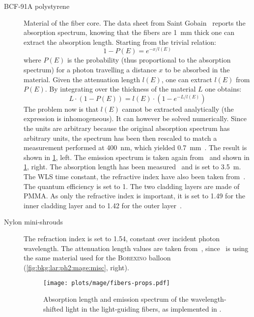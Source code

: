 \begin{description}

  \item[BCF-91A polystyrene] Material of the fiber core. The data sheet from Saint
    Gobain~\cite{FibersData} reports the absorption spectrum, knowing that the fibers are
    1~mm thick one can extract the absorption length. Starting from the trivial relation:
    \[
      1 - P(E) = e^{-x/l(E)}
    \]
    where $P(E)$ is the probability (thus proportional to the absorption
    spectrum) for a photon travelling a distance $x$ to be absorbed in the
    material. Given the attenuation length $l(E)$, one can extract $l(E)$ from
    $P(E)$. By integrating over the thickness of the material $L$ one obtains:
    \[
      L \cdot (1 - P(E)) = l(E) \cdot (1 - e^{-L/l(E)})
    \]
    The problem now is that $l(E)$ cannot be extracted analytically (the expression is
    inhomogeneous). It can however be solved numerically.  Since the units are arbitrary
    because the original absorption spectrum has arbitrary units, the spectrum has been
    then rescaled to match a measurement performed at 400~nm, which yielded
    0.7~mm~\cite{Kneissl2012}. The result is shown in
    \cref{fig:bkg:lar:ph2:mage:fibers-props}, left. The emission spectrum is taken again
    from~\cite{FibersData} and shown in \cref{fig:bkg:lar:ph2:mage:fibers-props}, right.
    The absorption length has been measured~\cite{Kneissl2012} and is set to 3.5~m. The
    WLS time constant, the refractive index have also been taken from~\cite{FibersData}.
    The quantum efficiency is set to 1. The two cladding layers are made of PMMA. As only
    the refractive index is important, it is set to 1.49 for the inner cladding layer and
    to 1.42 for the outer layer~\cite{FibersData}.

  \item[Nylon mini-shrouds] The refraction index is set to 1.54, constant over
    incident photon wavelength. The attenuation length values are taken
    from~\cite{Agostini2017b}, since \gerda\ is using the same material used for the
    \textsc{Borexino} balloon (\cref{fig:bkg:lar:ph2:mage:misc}, right).

    \begin{figure}
      \centering
      \texttt{[image: plots/mage/fibers-props.pdf]}
      \caption{%
        Absorption length and emission spectrum of the wavelength-shifted light in the
        light-guiding fibers, as implemented in \mage.
      }\label{fig:bkg:lar:ph2:mage:fibers-props}
    \end{figure}

\end{description}

